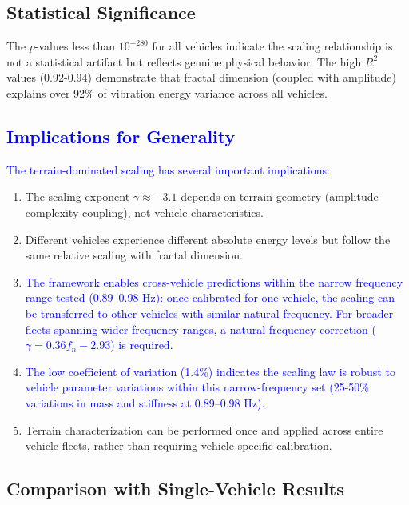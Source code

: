 \documentclass[11pt]{article}
\begin{document}
\subsection{Statistical Significance}

The $p$-values less than $10^{-280}$ for all vehicles indicate the scaling relationship is not a statistical artifact but reflects genuine physical behavior. The high $R^2$ values (0.92-0.94) demonstrate that fractal dimension (coupled with amplitude) explains over 92\% of vibration energy variance across all vehicles.

\subsection{\textcolor{blue}{Implications for Generality}}

\textcolor{blue}{The terrain-dominated scaling has several important implications:}

\begin{enumerate}
\item The scaling exponent $\gamma \approx -3.1$ depends on terrain geometry (amplitude-complexity coupling), not vehicle characteristics.

\item Different vehicles experience different absolute energy levels but follow the same relative scaling with fractal dimension.

\item \textcolor{blue}{The framework enables cross-vehicle predictions within the narrow frequency range tested (0.89--0.98 Hz): once calibrated for one vehicle, the scaling can be transferred to other vehicles with similar natural frequency. For broader fleets spanning wider frequency ranges, a natural-frequency correction ($\gamma = 0.36f_n - 2.93$) is required.}

\item \textcolor{blue}{The low coefficient of variation (1.4\%) indicates the scaling law is robust to vehicle parameter variations within this narrow-frequency set (25-50\% variations in mass and stiffness at 0.89--0.98 Hz).}

\item Terrain characterization can be performed once and applied across entire vehicle fleets, rather than requiring vehicle-specific calibration.
\end{enumerate}

\subsection{Comparison with Single-Vehicle Results}
\end{document}
